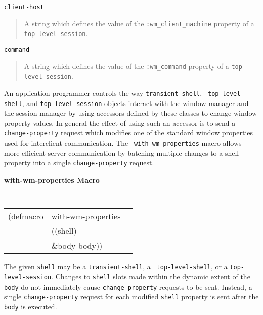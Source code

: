 \documentclass[twoside]{book}
\begin{document}
\begin{sloppy}
{\begin{flushright}
{}\end{flushright}
}

\begin{flushright} \parbox[t]{6.125in}{
{\tt client-host}
\begin{quote}
A string which defines the value of the
{\tt :wm\_client\_machine} property of a {\tt
top-level-session}. 
\end{quote}
}\end{flushright}


\begin{flushright} \parbox[t]{6.125in}{
{\tt command}
\begin{quote}
A string which defines the value of the
{\tt :wm\_command} property of a {\tt top-level-session}. 
\end{quote}
}\end{flushright}




An application programmer controls the way {\tt transient-shell}, {\tt
top-level-shell}, and {\tt top-level-session} objects interact with the
window manager and the session manager by using accessors defined by
these classes to change window property values. In general the effect of using
such an accessor is to send a {\tt change-property} request which modifies one
of the standard window properties used for interclient
communication. 
The {\tt
with-wm-properties} macro allows more efficient server communication by
batching multiple changes to a shell property into a single
{\tt change-property} request.

\pagebreak
{\samepage
{\large {\bf with-wm-properties \hfill Macro}} 
\begin{flushright} \parbox[t]{6.125in}{
\tt
\begin{tabular}{lll}
\raggedright
(defmacro & with-wm-properties & \\ 
& ((shell)\\
& \&body body))
\end{tabular}
\rm

}\end{flushright}}

\begin{flushright} \parbox[t]{6.125in}{
The given {\tt shell} may be a {\tt transient-shell}, a {\tt
top-level-shell}, or a {\tt top-level-session}. Changes to {\tt shell}
slots made within the dynamic extent of the {\tt body} do not
immediately cause {\tt change-property} requests to be sent. Instead, a single
{\tt change-property} request for each modified {\tt shell} property is sent
after the {\tt body} is executed.

}
\end{flushright}
\end{sloppy}
\end{document}
